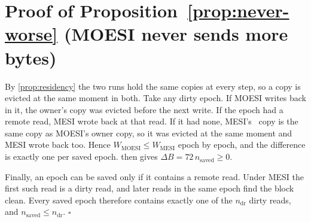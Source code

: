 \section{Proof of Proposition~\ref*{prop:never-worse} (MOESI never sends more bytes)}
\label{app:proof-never-worse}
%

By \cref{prop:residency} the two runs hold the same copies at every step, so a copy
is evicted at the same moment in both. Take any dirty epoch. If MOESI writes back in
it, the owner's copy was evicted before the next write. If the epoch had a remote
read, MESI wrote back at that read. If it had none, MESI's \stM\ copy is the same
copy as MOESI's owner copy, so it was evicted at the same moment and MESI wrote back
too. Hence $W_{\mathrm{MOESI}} \le W_{\mathrm{MESI}}$ epoch by epoch, and the
difference is exactly one per saved epoch.  then gives
$\Delta B = 72\,n_{\mathrm{saved}} \ge 0$.

Finally, an epoch can be saved only if it contains a remote read. Under MESI the
first such read is a dirty read, and later reads in the same epoch find the block
clean. Every saved epoch therefore contains exactly one of the $n_{\mathrm{dr}}$
dirty reads, and $n_{\mathrm{saved}} \le n_{\mathrm{dr}}$. $\square$
